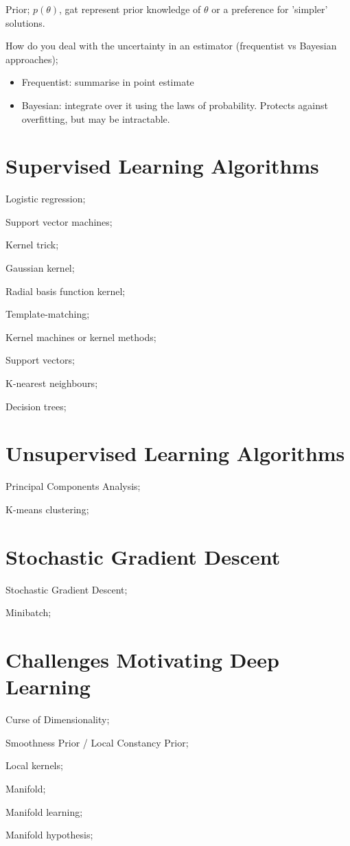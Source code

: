 \documentclass{article}
\begin{document}
Prior; $p(\theta)$, gat represent prior knowledge of $\theta$ or a preference for 'simpler' solutions.

How do you deal with the uncertainty in an estimator (frequentist vs Bayesian approaches); \begin{itemize}
	\item Frequentist: summarise in point estimate
	\item Bayesian: integrate over it using the laws of probability. Protects against overfitting, but may be intractable.
\end{itemize}

\section{Supervised Learning Algorithms}

Logistic regression;

Support vector machines;

Kernel trick;

Gaussian kernel;

Radial basis function kernel;

Template-matching;

Kernel machines or kernel methods;

Support vectors;

K-nearest neighbours;

Decision trees;

\section{Unsupervised Learning Algorithms}

Principal Components Analysis;

K-means clustering;

\section{Stochastic Gradient Descent}

Stochastic Gradient Descent;

Minibatch;

\section{Challenges Motivating Deep Learning}

Curse of Dimensionality;

Smoothness Prior / Local Constancy Prior;

Local kernels;

Manifold;

Manifold learning;

Manifold hypothesis;
\end{document}
